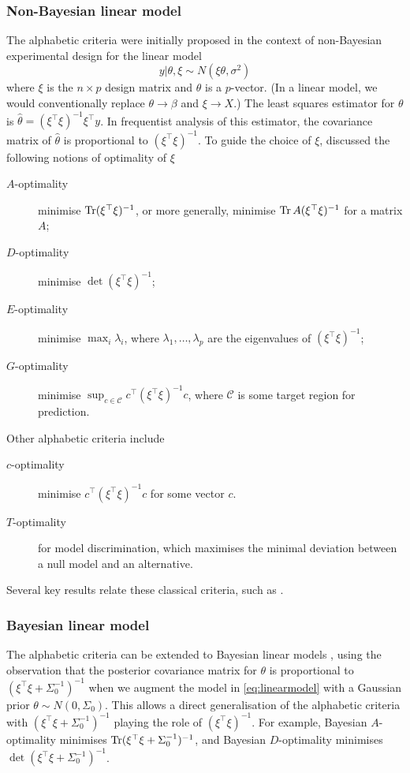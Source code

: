 \documentclass[a4paper, 10pt]{report}
\theoremstyle{plain}
\begin{document}
	\subsubsection{Non-Bayesian linear model}
	The alphabetic criteria were initially proposed in the context of non-Bayesian experimental design for the linear model
	\begin{equation}
	\label{eq:linearmodel}
	y|\theta,\xi \sim N(\xi \theta, \sigma^2)
	\end{equation}
	where $\xi$ is the $n\times p$ design matrix and $\theta$ is a $p$\hspace{1pt}-vector. (In a linear model, we would conventionally replace $\theta \rightarrow \beta$ and $\xi \rightarrow X$.)
	The least squares estimator for $\theta$ is $\hat{\theta} = (\xi^\top \xi)^{-1}\xi^\top y$. In frequentist analysis of this estimator, the covariance matrix of $\hat{\theta}$ is proportional to $(\xi^\top \xi)^{-1}$.	To guide the choice of $\xi$, \citet{box1982} discussed the following notions of optimality of $\xi$
	\begin{description}
		\item[$A$-optimality] minimise $\operatorname{Tr} (\xi^\top \xi)^{-1}$, or more generally, minimise $\operatorname{Tr} A(\xi^\top \xi)^{-1}$ for a matrix $A$;
		\item[$D$-optimality] minimise $\det (\xi^\top \xi)^{-1}$;
		\item[$E$-optimality] minimise $\max_i \lambda_i$, where $\lambda_1,\dots,\lambda_p$ are the eigenvalues of $(\xi^\top \xi)^{-1}$;
		\item[$G$-optimality] minimise $\sup_{c \in \mathcal{C}} c^\top(\xi^\top \xi)^{-1}c$, where $\mathcal{C}$ is some target region for prediction.
	\end{description}
	Other alphabetic criteria include
	\begin{description}
		\item[$c$-optimality~\citep{elfving1952optimum}] minimise $c^\top(\xi^\top \xi)^{-1}c$ for some vector $c$.
		\item[$T$-optimality~\citep{atkinson1975design}] for model discrimination, which maximises the minimal deviation between a null model and an alternative.
	\end{description}
	Several key results relate these classical criteria, such as \citet{kiefer1959optimum}.
	
	\subsubsection{Bayesian linear model}
	The alphabetic criteria can be extended to Bayesian linear models \citep{chaloner1995}, using the observation that the posterior covariance matrix for $\theta$ is proportional to $(\xi^\top \xi + \Sigma_0^{-1})^{-1}$ when we augment the model in \eqref{eq:linearmodel} with a Gaussian prior $\theta \sim N(0,\Sigma_0)$.
	This allows a direct generalisation of the alphabetic criteria with $(\xi^\top \xi + \Sigma_0^{-1})^{-1}$ playing the role of $(\xi^\top \xi)^{-1}$. For example, Bayesian $A$-optimality minimises $\operatorname{Tr} (\xi^\top \xi + \Sigma_0^{-1})^{-1}$, and Bayesian $D$-optimality minimises $\det (\xi^\top \xi + \Sigma_0^{-1})^{-1}$.
	
\end{document}
